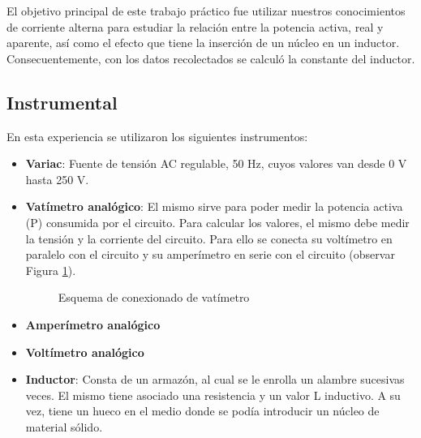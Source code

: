 \documentclass{article}
\begin{document}
        El objetivo principal de este trabajo práctico fue utilizar nuestros conocimientos de
         corriente alterna para estudiar la relación entre la potencia activa, real y aparente, 
         así como el efecto que tiene la inserción de un núcleo en un inductor.
        Consecuentemente, con los datos recolectados se calculó la constante del inductor.

        \subsection{Instrumental}

        En esta experiencia se utilizaron los siguientes instrumentos:

        \begin{itemize}
            \renewcommand{\labelitemi}{$\bullet$}
            \item {\bfseries Variac}: Fuente de tensión AC regulable, 50 Hz, cuyos valores van desde 0 V hasta 250 V.
            \item {\bfseries Vatímetro analógico}: El mismo sirve para poder medir la potencia activa (P) consumida por el circuito.
                    Para calcular los valores, el mismo debe medir la tensión y la corriente del circuito.
                     Para ello se conecta su voltímetro en paralelo con el circuito y su amperímetro en serie 
                     con el circuito (observar Figura \ref{fig:vatimetro}). \par

                    \begin{figure}[h!] %
                        \centering
                        \caption{Esquema de conexionado de vatímetro}
                        \label{fig:vatimetro}
                    \end{figure}
            \item {\bfseries Amperímetro analógico}
            \item {\bfseries Voltímetro analógico}
            \item {\bfseries Inductor}: Consta de un armazón, al cual se le enrolla un
             alambre sucesivas veces. El mismo tiene asociado una resistencia y un valor L inductivo. 
                A su vez, tiene un hueco en el medio donde se podía introducir un núcleo de material sólido. 
        \end{itemize}
        
\end{document}
